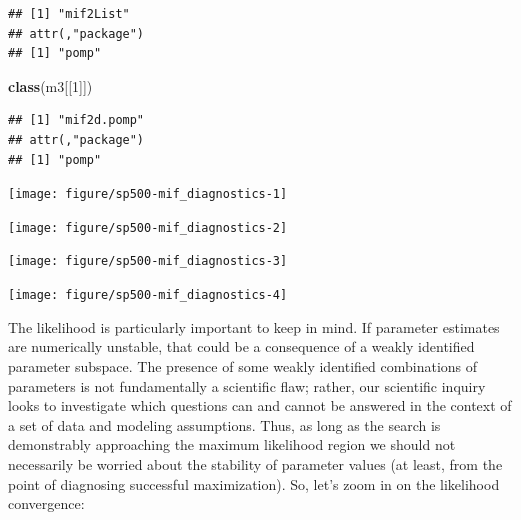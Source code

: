 \documentclass[]{article}
\newenvironment{Shaded}{\begin{snugshade}}{\end{snugshade}}
\newcommand{\KeywordTok}[1]{\textcolor[rgb]{0.13,0.29,0.53}{\textbf{#1}}}
\newcommand{\DecValTok}[1]{\textcolor[rgb]{0.00,0.00,0.81}{#1}}
\newcommand{\OperatorTok}[1]{\textcolor[rgb]{0.81,0.36,0.00}{\textbf{#1}}}
\newcommand{\NormalTok}[1]{#1}
\begin{document}
\begin{verbatim}
## [1] "mif2List"
## attr(,"package")
## [1] "pomp"
\end{verbatim}

\begin{Shaded}
\begin{Highlighting}[]
\KeywordTok{class}\NormalTok{(m3[[}\DecValTok{1}\NormalTok{]])}
\end{Highlighting}
\end{Shaded}

\begin{verbatim}
## [1] "mif2d.pomp"
## attr(,"package")
## [1] "pomp"
\end{verbatim}

\begin{Shaded}
\end{Shaded}

\begin{center}\texttt{[image: figure/sp500-mif\_diagnostics-1]} \end{center}

\begin{center}\texttt{[image: figure/sp500-mif\_diagnostics-2]} \end{center}

\begin{center}\texttt{[image: figure/sp500-mif\_diagnostics-3]} \end{center}

\begin{center}\texttt{[image: figure/sp500-mif\_diagnostics-4]} \end{center}

The likelihood is particularly important to keep in mind. If parameter
estimates are numerically unstable, that could be a consequence of a
weakly identified parameter subspace. The presence of some weakly
identified combinations of parameters is not fundamentally a scientific
flaw; rather, our scientific inquiry looks to investigate which
questions can and cannot be answered in the context of a set of data and
modeling assumptions. Thus, as long as the search is demonstrably
approaching the maximum likelihood region we should not necessarily be
worried about the stability of parameter values (at least, from the
point of diagnosing successful maximization). So, let's zoom in on the
likelihood convergence:
\end{document}
